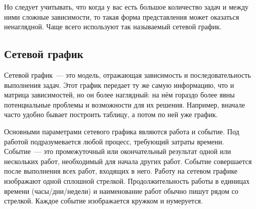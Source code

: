 \documentclass{../../text-style}
\begin{document}
Но следует учитывать, что когда у вас есть большое количество задач и между ними сложные зависимости, то такая форма представления может оказаться ненаглядной. Чаще всего используют так называемый сетевой график.

\subsection{Сетевой график}

Сетевой график~--- это модель, отражающая зависимость и последовательность выполнения задач. Этот график передает ту же самую информацию, что и матрица зависимостей, но он более наглядный: на нём гораздо более явны потенциальные проблемы и возможности для их решения. Например, вначале часто удобно бывает построить таблицу, а потом по ней уже график.

Основными параметрами сетевого графика являются работа и событие. Под работой подразумевается любой процесс, требующий затраты времени. Событие~--- это промежуточный или окончательный результат одной или нескольких работ, необходимый для начала других работ. Событие совершается после выполнения всех работ, входящих в него. Работу на сетевом графике изображают одной сплошной стрелкой. Продолжительность работы в единицах времени (часы/дни/недели) и наименование работ обычно пишут рядом со стрелкой. Каждое событие изображается кружком и нумеруется.

\begin{center}
\end{center}
\end{document}
